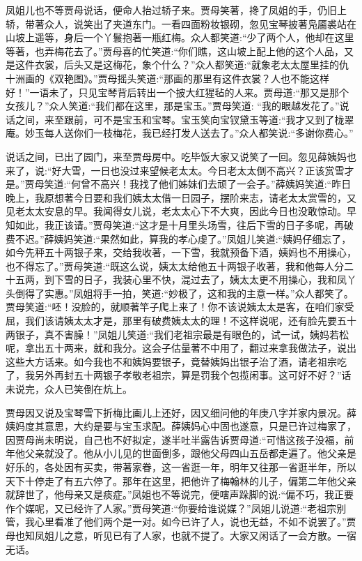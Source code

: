 \begin{parag}
    凤姐儿也不等贾母说话，便命人抬过轿子来。贾母笑著，搀了凤姐的手，仍旧上轿，带著众人，说笑出了夹道东门。一看四面粉妆银砌，忽见宝琴披著凫靥裘站在山坡上遥等，身后一个丫鬟抱著一瓶红梅。众人都笑道:“少了两个人，他却在这里等著，也弄梅花去了。”贾母喜的忙笑道:“你们瞧，这山坡上配上他的这个人品，又是这件衣裳，后头又是这梅花，象个什么？”众人都笑道:“就象老太太屋里挂的仇十洲画的《双艳图》。”贾母摇头笑道:“那画的那里有这件衣裳？人也不能这样好！”一语未了，只见宝琴背后转出一个披大红猩毡的人来。贾母道:“那又是那个女孩儿？”众人笑道:“我们都在这里，那是宝玉。”贾母笑道: “我的眼越发花了。”说话之间，来至跟前，可不是宝玉和宝琴。宝玉笑向宝钗黛玉等道:“我才又到了栊翠庵。妙玉每人送你们一枝梅花，我已经打发人送去了。”众人都笑说:“多谢你费心。”
\end{parag}


\begin{parag}
    说话之间，已出了园门，来至贾母房中。吃毕饭大家又说笑了一回。忽见薛姨妈也来了，说:“好大雪，一日也没过来望候老太太。今日老太太倒不高兴？正该赏雪才是。”贾母笑道:“何曾不高兴！我找了他们姊妹们去顽了一会子。”薛姨妈笑道:“昨日晚上，我原想著今日要和我们姨太太借一日园子，摆阶来志，请老太太赏雪的，又见老太太安息的早。我闻得女儿说，老太太心下不大爽，因此今日也没敢惊动。早知如此，我正该请。”贾母笑道:“这才是十月里头场雪，往后下雪的日子多呢，再破费不迟。”薛姨妈笑道:“果然如此，算我的孝心虔了。”凤姐儿笑道:“姨妈仔细忘了，如今先秤五十两银子来，交给我收著，一下雪，我就预备下酒，姨妈也不用操心，也不得忘了。”贾母笑道:“既这么说，姨太太给他五十两银子收著，我和他每人分二十五两，到下雪的日子，我装心里不快，混过去了，姨太太更不用操心，我和凤丫头倒得了实惠。”凤姐将手一拍，笑道:“妙极了，这和我的主意一样。”众人都笑了。贾母笑道:“呸！没脸的，就顺著竿子爬上来了！你不该说姨太太是客，在咱们家受屈，我们该请姨太太才是，那里有破费姨太太的理！不这样说呢，还有脸先要五十两银子，真不害臊！”凤姐儿笑道:“我们老祖宗最是有眼色的，试一试，姨妈若松呢，拿出五十两来，就和我分。这会子估量著不中用了，翻过来拿我做法子，说出这些大方话来。如今我也不和姨妈要银子，竟替姨妈出银子治了酒，请老祖宗吃了，我另外再封五十两银子孝敬老祖宗，算是罚我个包揽闲事。这可好不好？”话未说完，众人已笑倒在炕上。
\end{parag}


\begin{parag}
    贾母因又说及宝琴雪下折梅比画儿上还好，因又细问他的年庚八字并家内景况。薛姨妈度其意思，大约是要与宝玉求配。薛姨妈心中固也遂意，只是已许过梅家了，因贾母尚未明说，自己也不好拟定，遂半吐半露告诉贾母道:“可惜这孩子没福，前年他父亲就没了。他从小儿见的世面倒多，跟他父母四山五岳都走遍了。他父亲是好乐的，各处因有买卖，带著家眷，这一省逛一年，明年又往那一省逛半年，所以天下十停走了有五六停了。那年在这里，把他许了梅翰林的儿子，偏第二年他父亲就辞世了，他母亲又是痰症。”凤姐也不等说完，便嗐声跺脚的说:“偏不巧，我正要作个媒呢，又已经许了人家。”贾母笑道:“你要给谁说媒？”凤姐儿说道:“老祖宗别管，我心里看准了他们两个是一对。如今已许了人，说也无益，不如不说罢了。”贾母也知凤姐儿之意，听见已有了人家，也就不提了。大家又闲话了一会方散。一宿无话。
\end{parag}


